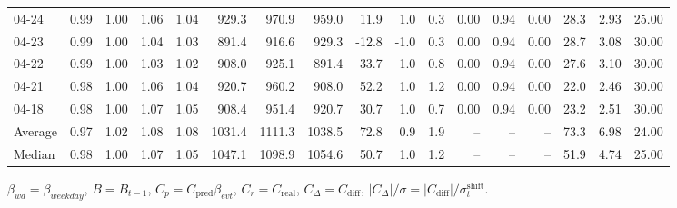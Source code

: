 \begin{threeparttable}
{\begin{tabular}{lrrrrrrrrrrrrrrrr}
  04-24 &         0.99 &           1.00 &          1.06 &          1.04 &  929.3 &  970.9 &  959.0 &       11.9 &                      1.0 &                 0.3 &       0.00 &      0.94 &           0.00 &             28.3 &            2.93 &                  25.00 \\
  04-23 &         0.99 &           1.00 &          1.04 &          1.03 &  891.4 &  916.6 &  929.3 &      -12.8 &                     -1.0 &                 0.3 &       0.00 &      0.94 &           0.00 &             28.7 &            3.08 &                  30.00 \\
  04-22 &         0.99 &           1.00 &          1.03 &          1.02 &  908.0 &  925.1 &  891.4 &       33.7 &                      1.0 &                 0.8 &       0.00 &      0.94 &           0.00 &             27.6 &            3.10 &                  30.00 \\
  04-21 &         0.98 &           1.00 &          1.06 &          1.04 &  920.7 &  960.2 &  908.0 &       52.2 &                      1.0 &                 1.2 &       0.00 &      0.94 &           0.00 &             22.0 &            2.46 &                  30.00 \\
  04-18 &         0.98 &           1.00 &          1.07 &          1.05 &  908.4 &  951.4 &  920.7 &       30.7 &                      1.0 &                 0.7 &       0.00 &      0.94 &           0.00 &             23.2 &            2.51 &                  30.00 \\
Average &         0.97 &           1.02 &          1.08 &          1.08 & 1031.4 & 1111.3 & 1038.5 &       72.8 &                      0.9 &                 1.9 &         -- &        -- &             -- &             73.3 &            6.98 &                  24.00 \\
 Median &         0.98 &           1.00 &          1.07 &          1.05 & 1047.1 & 1098.9 & 1054.6 &       50.7 &                      1.0 &                 1.2 &         -- &        -- &             -- &             51.9 &            4.74 &                  25.00 \\
\bottomrule
\end{tabular}
}
\begin{tablenotes}\footnotesize
\item $\beta_{wd}=\beta_{weekday}$, $B=B_{t-1}$,
$C_p=C_{\text{pred}}\beta_{evt}$, $C_r=C_{\text{real}}$,
$C_\Delta=C_{\text{diff}}$, $|C_\Delta|/\sigma=|C_{\text{diff}}|/\sigma_t^{\text{shift}}$.
\end{tablenotes}
\end{threeparttable}
\endgroup
